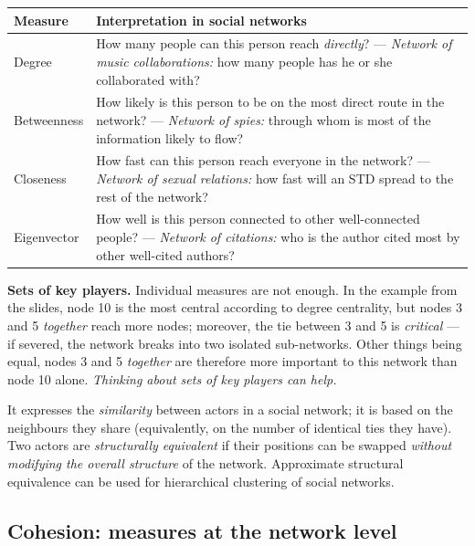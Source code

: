 \documentclass[11pt,a4paper]{article}
\theoremstyle{definition}
\begin{document}
\begin{center}
\small
\begin{tabular}{@{}p{2.7cm}p{12.6cm}@{}}
\toprule
\textbf{Measure} & \textbf{Interpretation in social networks} \\
\midrule
Degree & How many people can this person reach \emph{directly}? --- \emph{Network of music
  collaborations:} how many people has he or she collaborated with? \\
Betweenness & How likely is this person to be on the most direct route in the network? ---
  \emph{Network of spies:} through whom is most of the information likely to flow? \\
Closeness & How fast can this person reach everyone in the network? --- \emph{Network of sexual
  relations:} how fast will an STD spread to the rest of the network? \\
Eigenvector & How well is this person connected to other well-connected people? ---
  \emph{Network of citations:} who is the author cited most by other well-cited authors? \\
\bottomrule
\end{tabular}
\end{center}

\textbf{Sets of key players.} Individual measures are not enough. In the example from the slides,
node 10 is the most central according to degree centrality, but nodes 3 and 5 \emph{together} reach
more nodes; moreover, the tie between 3 and 5 is \emph{critical} --- if severed, the network breaks
into two isolated sub-networks. Other things being equal, nodes 3 and 5 \emph{together} are
therefore more important to this network than node 10 alone. \emph{Thinking about sets of key players
can help.}

\begin{defbox}
It expresses the \emph{similarity} between actors in a social network; it is based on the neighbours
they share (equivalently, on the number of identical ties they have). Two actors are
\emph{structurally equivalent} if their positions can be swapped \emph{without modifying the overall
structure} of the network. Approximate structural equivalence can be used for hierarchical
clustering of social networks.
\end{defbox}

\subsection{Cohesion: measures at the network level}
\end{document}
